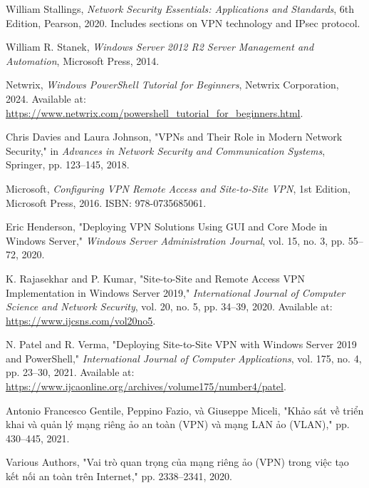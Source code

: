\documentclass[13pt]{report}
\begin{document}

\begin{thebibliography}{00}

 William Stallings, \textit{Network Security Essentials: Applications and Standards}, 6th Edition, Pearson, 2020. Includes sections on VPN technology and IPsec protocol.

 William R. Stanek, \textit{Windows Server 2012 R2 Server Management and Automation}, Microsoft Press, 2014.

 Netwrix, \textit{Windows PowerShell Tutorial for Beginners}, Netwrix Corporation, 2024. Available at: \url{https://www.netwrix.com/powershell_tutorial_for_beginners.html}.

 Chris Davies and Laura Johnson, "VPNs and Their Role in Modern Network Security," in \textit{Advances in Network Security and Communication Systems}, Springer, pp. 123--145, 2018.

 Microsoft, \textit{Configuring VPN Remote Access and Site-to-Site VPN}, 1st Edition, Microsoft Press, 2016. ISBN: 978-0735685061.

 Eric Henderson, "Deploying VPN Solutions Using GUI and Core Mode in Windows Server," \textit{Windows Server Administration Journal}, vol. 15, no. 3, pp. 55--72, 2020.

 K. Rajasekhar and P. Kumar, "Site-to-Site and Remote Access VPN Implementation in Windows Server 2019," \textit{International Journal of Computer Science and Network Security}, vol. 20, no. 5, pp. 34--39, 2020. Available at: \url{https://www.ijcsns.com/vol20no5}.

 N. Patel and R. Verma, "Deploying Site-to-Site VPN with Windows Server 2019 and PowerShell," \textit{International Journal of Computer Applications}, vol. 175, no. 4, pp. 23--30, 2021. Available at: \url{https://www.ijcaonline.org/archives/volume175/number4/patel}.

 Antonio Francesco Gentile, Peppino Fazio, và Giuseppe Miceli, "Khảo sát về triển khai và quản lý mạng riêng ảo an toàn (VPN) và mạng LAN ảo (VLAN)," pp. 430--445, 2021.

 Various Authors, "Vai trò quan trọng của mạng riêng ảo (VPN) trong việc tạo kết nối an toàn trên Internet," pp. 2338--2341, 2020.


\end{thebibliography}
\end{document}
